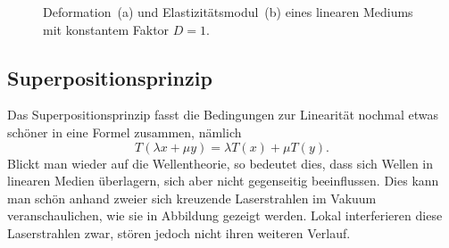 \begin{figure}
    \centering
    \hfill
    \caption{Deformation~(a) und Elastizitätsmodul~(b) eines linearen Mediums mit konstantem Faktor $D = 1$.}
\end{figure}

\subsection{Superpositionsprinzip}\label{particles:section:lin-medium:superposition} %
Das Superpositionsprinzip fasst die Bedingungen zur Linearität nochmal etwas schöner in eine Formel zusammen, 
nämlich
\[
    T(\lambda x + \mu y)
    = 
    \lambda T(x) 
    + 
    \mu T(y).
\]
Blickt man wieder auf die Wellentheorie, so bedeutet dies, dass sich Wellen in linearen Medien überlagern, sich aber nicht gegenseitig beeinflussen.
Dies kann man schön anhand zweier sich kreuzende Laserstrahlen im Vakuum veranschaulichen, wie sie in Abbildung  gezeigt werden.
Lokal interferieren diese Laserstrahlen zwar, stören jedoch nicht ihren weiteren Verlauf.


